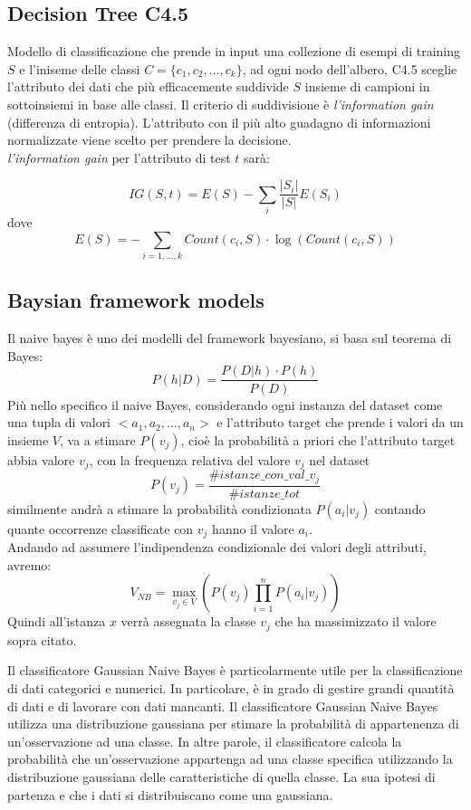\documentclass[italian,12pt,a4paper]{article}
\begin{document}
	\subsection{Decision Tree C4.5}
    Modello di classificazione che prende in input una collezione di esempi di training $S$ e l'iniseme delle classi $C = \{c_1, c_2, \dots, c_k\}$, ad ogni nodo dell'albero, C4.5 sceglie l'attributo dei dati che più efficacemente suddivide $S$ insieme di campioni in sottoinsiemi in base alle classi. Il criterio di suddivisione è \textit{l'information gain} (differenza di entropia). L'attributo con il più alto guadagno di informazioni normalizzate viene scelto per prendere la decisione. \\
	\textit{l'information gain} per l'attributo di test $t$ sarà:
	
	$$IG(S, t) = E(S) - \sum_i \frac{|S_i|}{|S|}E(S_i)$$ dove $$E(S) = -\sum_{i = 1, \dots, k} Count(c_i, S)\cdot\log(Count(c_i, S))$$

    \subsection{Baysian framework models} 
	Il naive bayes è uno dei modelli del framework bayesiano, si basa sul teorema di Bayes:
	$$P(h|D) = \frac{P(D|h)\cdot P(h)}{P(D)}$$
	Più nello specifico il naive Bayes, considerando ogni instanza del dataset come una tupla di valori $<a_1, a_2, \dots, a_n>$ e l'attributo target che prende i valori da un insieme $V$, va a stimare $P(v_j)$, cioè la probabilità a priori che l'attributo target abbia valore $v_j$, con la frequenza relativa del valore $v_j$ nel dataset $$P(v_j) = \frac{\#istanze\_con\_val\_v_j}{\#istanze\_tot}$$ similmente andrà a stimare la probabilità condizionata $P(a_i|v_j)$ contando quante occorrenze classificate con $v_j$ hanno il valore $a_i$. \\
	Andando ad assumere l'indipendenza condizionale dei valori degli attributi, avremo:
	$$V_{NB} = \max_{v_j \in V}(P(v_j)\prod_{i = 1}^{n} P(a_i|v_j))$$
	Quindi all'istanza $x$ verrà assegnata la classe $v_j$ che ha massimizzato il valore sopra citato.
    \\
    \vspace{25pt}
    
    Il classificatore Gaussian Naive Bayes è particolarmente utile per la classificazione di dati categorici e numerici. In particolare, è in grado di gestire grandi quantità di dati e di lavorare con dati mancanti. Il classificatore Gaussian Naive Bayes utilizza una distribuzione gaussiana per stimare la probabilità di appartenenza di un'osservazione ad una classe. In altre parole, il classificatore calcola la probabilità che un'osservazione appartenga ad una classe specifica utilizzando la distribuzione gaussiana delle caratteristiche di quella classe. La sua ipotesi di partenza e che i dati si distribuiscano come una gaussiana.
    \\
    \vspace{25pt}
\end{document}
